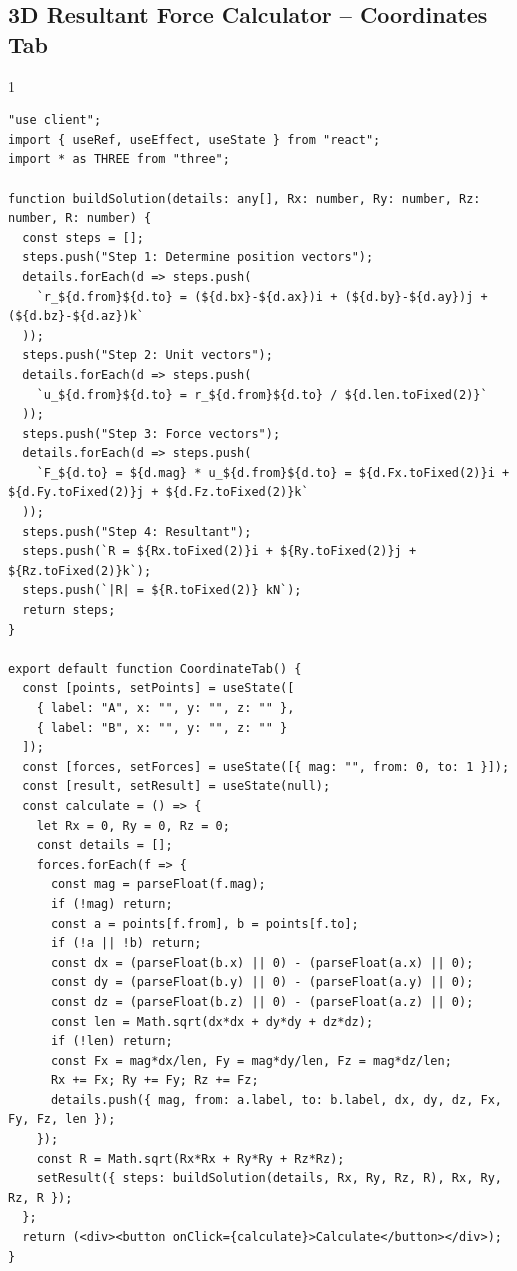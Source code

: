 \subsection*{3D Resultant Force Calculator -- Coordinates Tab}
\begin{spacing}{1}
\begin{Verbatim}[breaklines=true, breaksymbolleft={}, breaksymbolright={}]
"use client";
import { useRef, useEffect, useState } from "react";
import * as THREE from "three";

function buildSolution(details: any[], Rx: number, Ry: number, Rz: number, R: number) {
  const steps = [];
  steps.push("Step 1: Determine position vectors");
  details.forEach(d => steps.push(
    `r_${d.from}${d.to} = (${d.bx}-${d.ax})i + (${d.by}-${d.ay})j + (${d.bz}-${d.az})k`
  ));
  steps.push("Step 2: Unit vectors");
  details.forEach(d => steps.push(
    `u_${d.from}${d.to} = r_${d.from}${d.to} / ${d.len.toFixed(2)}`
  ));
  steps.push("Step 3: Force vectors");
  details.forEach(d => steps.push(
    `F_${d.to} = ${d.mag} * u_${d.from}${d.to} = ${d.Fx.toFixed(2)}i + ${d.Fy.toFixed(2)}j + ${d.Fz.toFixed(2)}k`
  ));
  steps.push("Step 4: Resultant");
  steps.push(`R = ${Rx.toFixed(2)}i + ${Ry.toFixed(2)}j + ${Rz.toFixed(2)}k`);
  steps.push(`|R| = ${R.toFixed(2)} kN`);
  return steps;
}

export default function CoordinateTab() {
  const [points, setPoints] = useState([
    { label: "A", x: "", y: "", z: "" },
    { label: "B", x: "", y: "", z: "" }
  ]);
  const [forces, setForces] = useState([{ mag: "", from: 0, to: 1 }]);
  const [result, setResult] = useState(null);
  const calculate = () => {
    let Rx = 0, Ry = 0, Rz = 0;
    const details = [];
    forces.forEach(f => {
      const mag = parseFloat(f.mag);
      if (!mag) return;
      const a = points[f.from], b = points[f.to];
      if (!a || !b) return;
      const dx = (parseFloat(b.x) || 0) - (parseFloat(a.x) || 0);
      const dy = (parseFloat(b.y) || 0) - (parseFloat(a.y) || 0);
      const dz = (parseFloat(b.z) || 0) - (parseFloat(a.z) || 0);
      const len = Math.sqrt(dx*dx + dy*dy + dz*dz);
      if (!len) return;
      const Fx = mag*dx/len, Fy = mag*dy/len, Fz = mag*dz/len;
      Rx += Fx; Ry += Fy; Rz += Fz;
      details.push({ mag, from: a.label, to: b.label, dx, dy, dz, Fx, Fy, Fz, len });
    });
    const R = Math.sqrt(Rx*Rx + Ry*Ry + Rz*Rz);
    setResult({ steps: buildSolution(details, Rx, Ry, Rz, R), Rx, Ry, Rz, R });
  };
  return (<div><button onClick={calculate}>Calculate</button></div>);
}
\end{Verbatim}
\end{spacing}

